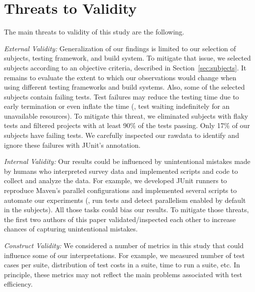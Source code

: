 \section{Threats to Validity}

The main threats to validity of this study are the following.

\textit{External Validity:} Generalization of our findings is limited
to our selection of subjects, testing framework, and build system.  To
mitigate that issue, we selected subjects according to an objective
criteria, described in Section~\ref{sec:subjects}.  It remains to
evaluate the extent to which our observations would change when using
different testing frameworks and build systems.
Also, some of the selected subjects contain failing tests. Test
failures may reduce the testing time due to early termination
or even inflate the time (\eg, test waiting indefinitely for
an unavailable resources).
To mitigate this threat, we eliminated subjects with flaky tests and
filtered projects with at least 90\% of the tests passing.
Only 17\% of our subjects have failing tests.
We carefully inspected our rawdata to identify and ignore these
failures with JUnit's  annotation.

\textit{Internal Validity:} Our results could be influenced by
unintentional mistakes made by humans who interpreted survey data and
implemented scripts and code to collect and analyze the data.
For example, we developed JUnit runners to reproduce Maven's parallel
configurations and implemented several scripts to automate our
experiments (\eg, run tests and detect parallelism enabled by default
in the subjects).
All those tasks could bias our results.
To mitigate those threats, the first two authors of this paper
validated/inspected each other to increase chances of capturing
unintentional mistakes.

\textit{Construct Validity:} We considered a number of metrics in this
study that could influence some of our interpretations.  For example,
we measured number of test cases per suite, distribution of test costs
in a suite, time to run a suite, etc.  In principle, these metrics may
not reflect the main problems associated with test
efficiency.

